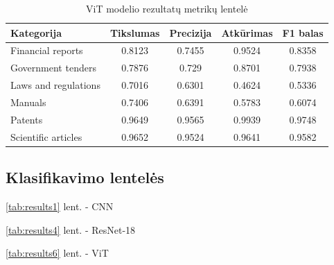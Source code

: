 \documentclass[conference]{IEEEtran}
\begin{document}
\begin{table}[p]
    \vfill
    \centering
    \caption{ViT modelio rezultatų metrikų lentelė}
    \label{tab:results5}
    \begin{tabular}{lcccc}
    \hline
    Kategorija & Tikslumas & Precizija & Atkūrimas & F1 balas \\
    \hline
    Financial reports & 0.8123 & 0.7455 & 0.9524 & 0.8358 \\
    Government tenders & 0.7876 & 0.729 & 0.8701 & 0.7938 \\
    Laws and regulations & 0.7016 & 0.6301 & 0.4624 & 0.5336 \\
    Manuals & 0.7406 & 0.6391 & 0.5783 & 0.6074 \\
    Patents & 0.9649 & 0.9565 & 0.9939 & 0.9748 \\
    Scientific articles & 0.9652 & 0.9524 & 0.9641 & 0.9582 \\
    \hline
    \end{tabular}
\end{table}

\subsection{Klasifikavimo lentelės}

\ref{tab:results1} lent. - CNN 

\ref{tab:results4} lent. - ResNet-18 

\ref{tab:results6} lent. - ViT 

\begin{table}[p]
    \vfill
    \centering
    \caption{CNN modelio klasifikavimo lentelė}
    \label{tab:results1}
\end{table}
\end{document}
